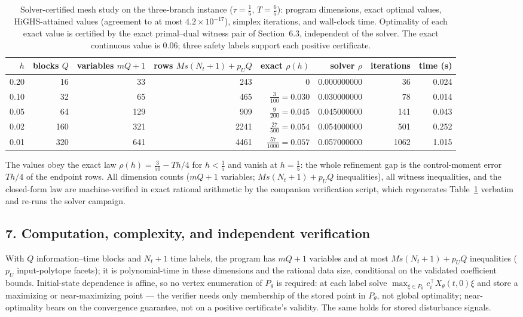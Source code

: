 \documentclass[10pt,twocolumn]{article}
\theoremstyle{definition}
\begin{document}
\begin{table}[t]
\centering
\footnotesize
\begin{tabular}{@{}r|r|r|r|r|r|r|r@{}}
\toprule
\(h\) & blocks \(Q\) & variables \(mQ{+}1\) & rows \(Ms(N_t{+}1)+p_UQ\) & exact \(\rho(h)\) & solver \(\rho\) & iterations & time (s) \\
\midrule
0.20 & 16 & 33  & 243  & \(0\) & 0.000000000 & 36   & 0.024 \\
0.10 & 32 & 65  & 465  & \(\tfrac{3}{100} = 0.030\) & 0.030000000 & 78   & 0.014 \\
0.05 & 64 & 129 & 909  & \(\tfrac{9}{200} = 0.045\) & 0.045000000 & 141  & 0.043 \\
0.02 & 160 & 321 & 2241 & \(\tfrac{27}{500} = 0.054\) & 0.054000000 & 501  & 0.252 \\
0.01 & 320 & 641 & 4461 & \(\tfrac{57}{1000} = 0.057\) & 0.057000000 & 1062 & 1.015 \\
\bottomrule
\end{tabular}
\caption{Solver-certified mesh study on the three-branch instance
(\(\tau = \tfrac15\), \(T = \tfrac65\)): program dimensions, exact optimal
values, HiGHS-attained values (agreement to at most \(4.2 \times 10^{-17}\)),
simplex iterations, and wall-clock time. Optimality of each exact value is
certified by the exact primal--dual witness pair of Section~6.3, independent
of the solver. The exact continuous value is \(0.06\); three safety labels
support each positive certificate.}
\label{tab:mesh}
\end{table}

The values obey the exact law \(\rho(h) = \tfrac{3}{50} - Th/4\) for
\(h < \tfrac15\) and vanish at \(h = \tfrac15\): the whole refinement gap is
the control-moment error \(Th/4\) of the endpoint rows. All dimension counts
(\(mQ + 1\) variables; \(Ms(N_t{+}1) + p_U Q\) inequalities), all witness
inequalities, and the closed-form law are machine-verified in exact rational
arithmetic by the companion verification script, which regenerates
Table~\ref{tab:mesh} verbatim and re-runs the solver campaign.

\subsection{7. Computation, complexity, and independent verification}\label{computation}

With \(Q\) information--time blocks and \(N_t + 1\) time labels, the program
has \(mQ + 1\) variables and at most \(Ms(N_t{+}1) + p_U Q\) inequalities
(\(p_U\) input-polytope facets); it is polynomial-time in these dimensions
and the rational data size, conditional on the validated coefficient bounds.
Initial-state dependence is affine, so no vertex enumeration of \(P_\theta\)
is required: at each label solve \(\max_{\xi \in P_\theta} c_i^\top
X_\theta(t,0)\xi\) and store a maximizing or near-maximizing point ---
the verifier needs only membership of the stored point in \(P_\theta\), not
global optimality; near-optimality bears on the convergence guarantee, not on
a positive certificate's validity. The same holds for stored disturbance
signals.
\end{document}
